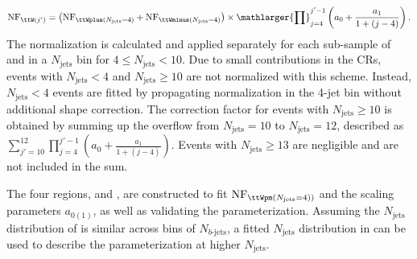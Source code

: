 \documentclass[../thesis.tex]{subfiles}
\begin{document}
\begin{equation}
\label{eq:ttWdd}
\mathrm{NF}_{\ttW(j')} = \left(\mathrm{NF}_{\ttWplus(N_\mathrm{jets}=4)} + \mathrm{NF}_{\ttWminus(N_\mathrm{jets}=4)}\right) \times \mathlarger{\prod}_{j=4}^{j'-1} \left( a_0 + \frac{a_1}{1+(j-4)} \right).
\end{equation}
The normalization is calculated and applied separately for each sub-sample of \ttWplus and \ttWminus in a $N_\mathrm{jets}$ bin for $4\leq N_\mathrm{jets}<10$. Due to small contributions in the \acs{CR}s, events with $N_\mathrm{jets}<4$ and $N_\mathrm{jets}\geq 10$ are not normalized with this scheme. Instead, $N_\mathrm{jets}<4$ events are fitted by propagating normalization in the 4-jet bin without additional shape correction. The correction factor for \ttW events with $N_\mathrm{jets}\geq 10$ is obtained by summing up the overflow from $N_\mathrm{jets}=10$ to $N_\mathrm{jets}=12$, described as $\sum_{j'=10}^{12} \prod_{j=4}^{j'-1}\left(a_0+\frac{a_1}{1+(j-4)}\right)$. Events with $N_\mathrm{jets}\geq 13$ are negligible and are not included in the sum.

The four regions, \CRttWpm and \CRonebpm, are constructed to fit $\mathrm{NF}_{\ttWpm(N_\mathrm{jets}=4))}$ and the scaling parameters $a_{0(1)}$, as well as validating the parameterization. Assuming the $N_\mathrm{jets}$ distribution of \ttW is similar across bins of $N_{b\text{-jets}}$, a fitted $N_\mathrm{jets}$ distribution in \CRonebpm can be used to describe the \ttW parameterization at higher $N_\mathrm{jets}$.
\end{document}
